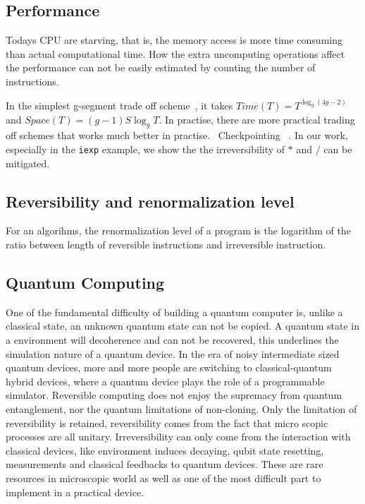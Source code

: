 \documentclass[aps,twocolumn,longbibliography,english,superscriptaddress,prr]{revtex4-1}
\newcommand{\<}{\langle}
\renewcommand{\>}{\rangle}
\begin{document}
\subsection{Performance}
Todays CPU are starving, that is, the memory access is more time consuming than actual computational time.
How the extra uncomputing operations affect the performance can not be easily estimated by counting the number of instructions.

In the simplest g-segment trade off scheme~\cite{}, it takes $Time(T) = T^{\log _g(4g-2)}$ and $Space(T) = (g-1)S\log_g T$.
In practise, there are more practical trading off schemes that works much better in practise.~\cite{}
Checkpointing ~\cite{Chen2016}.
In our work, especially in the \texttt{iexp} example, we show the the irreversibility of $*$ and $/$ can be mitigated.

\subsection{Reversibility and renormalization level}
    For an algorihms, the renormalization level of a program is the logarithm of the ratio between length of reversible instructions and irreversible instruction.

\subsection{Quantum Computing}
One of the fundamental difficulty of building a quantum computer is, unlike a classical state, an unknown quantum state can not be copied.
A quantum state in a environment will decoherence and can not be recovered, this underlines the simulation nature of a quantum device.
In the era of noisy intermediate sized quantum devices, more and more people are switching to classical-quantum hybrid devices, where a quantum device plays the role of a programmable simulator.
Reversible computing does not enjoy the supremacy from quantum entanglement, nor the quantum limitations of non-cloning.
Only the limitation of reversibility is retained, reversibility comes from the fact that micro scopic processes are all unitary.
Irreversibility can only come from the interaction with classical devices, like environment induces decaying, qubit state resetting, measurements and classical feedbacks to quantum devices. These are rare resources in microscopic world as well as one of the most difficult part to implement in a practical device.
\end{document}
